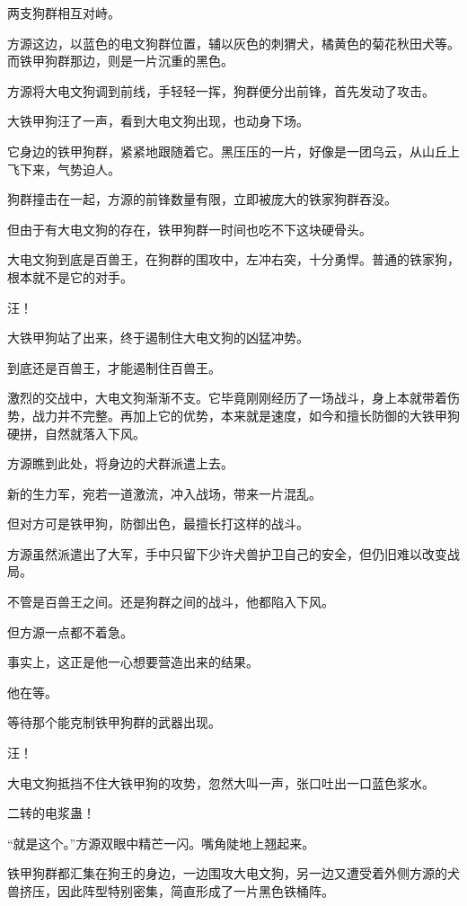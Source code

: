 
\begin{this_body}

两支狗群相互对峙。

方源这边，以蓝色的电文狗群位置，辅以灰色的刺猬犬，橘黄色的菊花秋田犬等。而铁甲狗群那边，则是一片沉重的黑色。

方源将大电文狗调到前线，手轻轻一挥，狗群便分出前锋，首先发动了攻击。

大铁甲狗汪了一声，看到大电文狗出现，也动身下场。

它身边的铁甲狗群，紧紧地跟随着它。黑压压的一片，好像是一团乌云，从山丘上飞下来，气势迫人。

狗群撞击在一起，方源的前锋数量有限，立即被庞大的铁家狗群吞没。

但由于有大电文狗的存在，铁甲狗群一时间也吃不下这块硬骨头。

大电文狗到底是百兽王，在狗群的围攻中，左冲右突，十分勇悍。普通的铁家狗，根本就不是它的对手。

汪！

大铁甲狗站了出来，终于遏制住大电文狗的凶猛冲势。

到底还是百兽王，才能遏制住百兽王。

激烈的交战中，大电文狗渐渐不支。它毕竟刚刚经历了一场战斗，身上本就带着伤势，战力并不完整。再加上它的优势，本来就是速度，如今和擅长防御的大铁甲狗硬拼，自然就落入下风。

方源瞧到此处，将身边的犬群派遣上去。

新的生力军，宛若一道激流，冲入战场，带来一片混乱。

但对方可是铁甲狗，防御出色，最擅长打这样的战斗。

方源虽然派遣出了大军，手中只留下少许犬兽护卫自己的安全，但仍旧难以改变战局。

不管是百兽王之间。还是狗群之间的战斗，他都陷入下风。

但方源一点都不着急。

事实上，这正是他一心想要营造出来的结果。

他在等。

等待那个能克制铁甲狗群的武器出现。

汪！

大电文狗抵挡不住大铁甲狗的攻势，忽然大叫一声，张口吐出一口蓝色浆水。

二转的电浆蛊！

“就是这个。”方源双眼中精芒一闪。嘴角陡地上翘起来。

铁甲狗群都汇集在狗王的身边，一边围攻大电文狗，另一边又遭受着外侧方源的犬兽挤压，因此阵型特别密集，简直形成了一片黑色铁桶阵。


\end{this_body}

